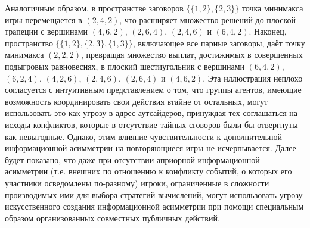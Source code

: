 Аналогичным образом, в пространстве заговоров $\{\{1, 2\}, \{2, 3\}\}$ точка минимакса игры перемещается в $(2, 4, 2)$, что расширяет множество решений до плоской трапеции с вершинами $(4, 6, 2)$, $(2, 6, 4)$, $(2, 4, 6)$ и $(6, 4, 2)$. Наконец, пространство $\{\{1, 2\}, \{2, 3\}, \{1, 3\}\}$, включающее все парные заговоры, даёт точку минимакса $(2, 2, 2)$, превращая множество выплат, достижимых в совершенных подыгровых равновесиях, в плоский шестиугольник с вершинами $(6, 4, 2)$, $(6, 2, 4)$, $(4, 2, 6)$, $(2, 4, 6)$, $(2, 6, 4)$ и $(4, 6, 2)$. Эта иллюстрация неплохо согласуется с интуитивным представлением о том, что группы агентов, имеющие возможность координировать свои действия втайне от остальных, могут использовать это как угрозу в адрес аутсайдеров, принуждая тех соглашаться на исходы конфликтов, которые в отсутствие тайных сговоров были бы отвергнуты как невыгодные. Однако, этим влияние чувствительности к дополнительной информационной асимметрии на повторяющиеся игры не исчерпывается. Далее будет показано, что даже при отсутствии априорной информационной асимметрии (т.е. внешних по отношению к конфликту событий, о которых его участники осведомлены по-разному) игроки, ограниченные в сложности производимых ими для выбора стратегий вычислений, могут использовать угрозу искусственного создания информационной асимметрии при помощи специальным образом организованных совместных публичных действий.



